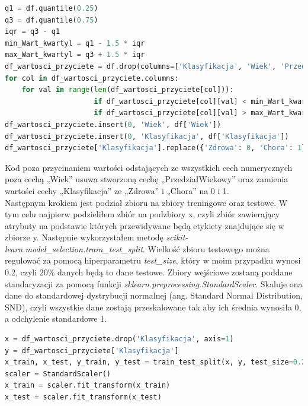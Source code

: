 \documentclass[a4paper,12pt,oneside]{book}
\begin{document}
\begin{lstlisting}[language=Python, caption='Przycinanie' wartości odstających]
q1 = df.quantile(0.25)
q3 = df.quantile(0.75)
iqr = q3 - q1
min_Wart_kwartyl = q1 - 1.5 * iqr
max_Wart_kwartyl = q3 + 1.5 * iqr
df_wartosci_przyciete = df.drop(columns=['Klasyfikacja', 'Wiek', 'PrzedzialWiekowy'])
for col in df_wartosci_przyciete.columns:
    for val in range(len(df_wartosci_przyciete[col])):
                     if df_wartosci_przyciete[col][val] < min_Wart_kwartyl[col]: df_wartosci_przyciete[col][val] = min_Wart_kwartyl[col]
                     if df_wartosci_przyciete[col][val] > max_Wart_kwartyl[col]: df_wartosci_przyciete[col][val] = max_Wart_kwartyl[col]
df_wartosci_przyciete.insert(0, 'Wiek', df['Wiek'])
df_wartosci_przyciete.insert(0, 'Klasyfikacja', df['Klasyfikacja'])
df_wartosci_przyciete['Klasyfikacja'].replace({'Zdrowa': 0, 'Chora': 1}, inplace=True)
\end{lstlisting}

Kod poza przycinaniem wartości odstających ze wszystkich cech numerycznych poza cechą „Wiek” usuwa stworzoną cechę „PrzedziałWiekowy” oraz zamienia wartości cechy „Klasyfikacja” ze „Zdrowa” i „Chora” na 0 i 1.\\
Następnym krokiem jest podział zbioru na zbiory treningowe oraz testowe. W tym celu najpierw podzieliłem zbiór na podzbiory x, czyli zbiór zawierający atrybuty na podstawie których przewidywane będą etykiety znajdujące się w zbiorze y. Następnie wykorzystałem metodę \textit{scikit-learn.model\_selection.train\_test\_split}. Wielkość zbioru testowego można regulować za pomocą hiperparametru \textit{test\_size}, który w moim przypadku wynosi 0.2, czyli 20\% danych będą to dane testowe. Zbiory wejściowe zostaną poddane standaryzacji za pomocą funkcji \textit{sklearn.preprocessing.StandardScaler}. Skaluje ona dane do standardowej dystrybucji normalnej (ang. Standard Normal Distribution, SND), czyli wszystkie dane zostają przeskalowane tak aby ich średnia wynosiła 0, a odchylenie standardowe 1.

\begin{lstlisting}[language=Python, caption=Przygotowanie zbiotów treningowych oraz testowych]
x = df_wartosci_przyciete.drop('Klasyfikacja', axis=1)
y = df_wartosci_przyciete['Klasyfikacja']
x_train, x_test, y_train, y_test = train_test_split(x, y, test_size=0.2, random_state=42)
scaler = StandardScaler()
x_train = scaler.fit_transform(x_train)
x_test = scaler.fit_transform(x_test)
\end{lstlisting}
\end{document}
